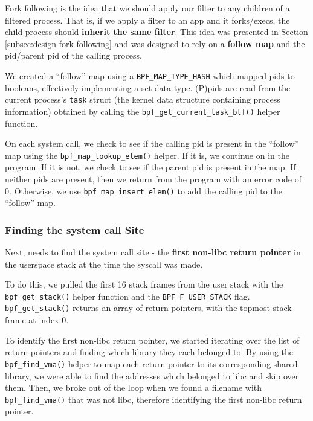 Fork following is the idea that we should apply our filter to any children of a
filtered process. That is, if we apply a filter to an app and it forks/execs,
the child process should \textbf{inherit the same filter}. This idea was
presented in Section \ref{subsec:design-fork-following} and was designed to rely
on a \textbf{follow map} and the \ac{pid}/parent \ac{pid} of the calling
process.

We created a ``follow'' map using a \texttt{BPF\_MAP\_TYPE\_HASH} which mapped
\ac{pid}s to booleans, effectively implementing a set data type. (P)\acp{pid}
are read from the current process's \texttt{task} struct (the kernel data
structure containing process information) obtained by calling the
\texttt{bpf\_get\_current\_task\_btf()} helper function. 

On each system call, we check to see if the calling \ac{pid} is present in the
``follow'' map using the \texttt{bpf\_map\_lookup\_elem()} helper. If it is, we continue 
on in the program. If it is not, we check to see if the parent \ac{pid} is
present in the map. If neither \acp{pid} are present, then we return from the
program with an error code of 0. Otherwise, we use
\texttt{bpf\_map\_insert\_elem()} to add the calling \ac{pid} to the 
``follow'' map.

\subsubsection{Finding the system call Site}\label{subsec:impl-syscall-site}

Next, \af needs to find the system call site - the \textbf{first non-\ac{libc} return pointer} in the userspace stack at the time the syscall was made.

To do this, we pulled the first 16 stack frames from the user stack with the 
\texttt{bpf\_get\_stack()} helper function and the \texttt{BPF\_F\_USER\_STACK}
flag. \texttt{bpf\_get\_stack()} returns an array of return pointers, with the
topmost stack frame at index 0. 

To identify the first non-\ac{libc} return pointer, we started iterating over
the list of return pointers and finding which library they each belonged to.
By using the \texttt{bpf\_find\_vma()} helper to map each return pointer to its
corresponding shared library, we were able to find the addresses which belonged
to \ac{libc} and skip over them. Then, we broke out of the loop when we found a
filename with \texttt{bpf\_find\_vma()} that was not \ac{libc}, therefore
identifying the first non-\ac{libc} return pointer.

